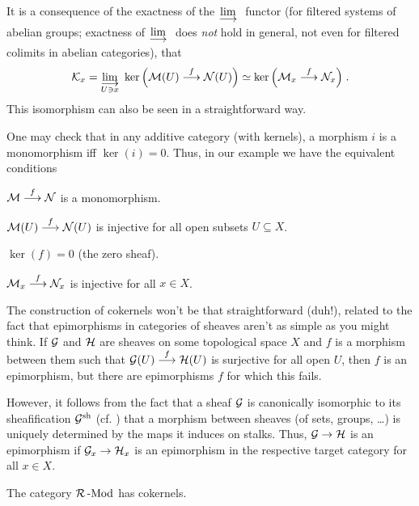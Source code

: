 \documentclass[a4paper,parskip=half,numbers=enddot, DIV=12]{scrreprt}
\begin{document}
\begin{rem}
	\begin{alphanumerate}
		\item {}It is a consequence of the exactness of the $\colimit$ functor (for filtered systems of abelian groups; exactness of $\colimit$ does \emph{not} hold in general, not even for filtered colimits in abelian categories), that 
		\begin{align*}
		\Kk_x=\colimit[U\ni x]\ker\Big(\Mm(U)\morphism[f]\Nn(U)\Big)\simeq\ker\Big(\Mm_x\morphism[f]\Nn_x\Big)\;.
		\end{align*}
		This isomorphism can also be seen in a straightforward way.
		
		\item One may check that in any additive category (with kernels), a morphism $i$ is a monomorphism iff $\ker(i)=0$. Thus, in our example we have the equivalent conditions
		\begin{alphanumerate}
			\item[\itememph{\alpha}] $\Mm\morphism[f]\Nn$ is a monomorphism.
			\item[\itememph{\beta}] $\Mm(U)\morphism[f]\Nn(U)$ is injective for all open subsets $U\subseteq X$.
			\item[\itememph{\gamma}] $\ker(f)=0$ (the zero sheaf).
			\item[\itememph{\delta}] $\Mm_x\morphism[f]\Nn_x$ is injective for all $x\in X$.
		\end{alphanumerate}
	\end{alphanumerate}
	The construction of cokernels won't be that straightforward (duh!), related to the fact that epimorphisms in categories of sheaves aren't as simple as you might think. If $\mathcal{G}$ and $\mathcal{H}$ are sheaves on some topological space $X$ and $f$ is a morphism between them such that $\Gg(U)\morphism[f]\Hh(U)$ is surjective for all open $U$, then $f$ is an epimorphism, but there are epimorphisms $f$ for which this fails. 
	
	However, it follows from the fact that a sheaf $\mathcal{G}$ is canonically isomorphic to its sheafification $\mathcal{G}^{\mathrm{sh}}$ (cf. \cite[Proposition~1.2.1]{alggeo1}) that a morphism between sheaves (of sets, groups, \ldots) is uniquely determined by the maps it induces on stalks. Thus, $\Gg\morphism\Hh$ is an epimorphism if $\Gg_x\morphism\Hh_x$ is an epimorphism in the respective target category for all $x\in X$.
\end{rem}
\begin{lem}
	The category $\mathcal{R}\operatorname{-Mod}$ has cokernels.
\end{lem}
\end{document}
